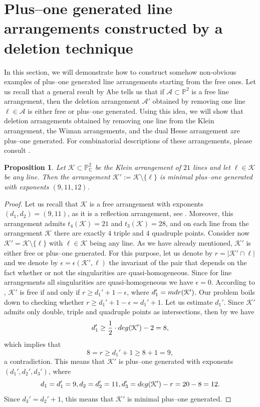 \documentclass[12pt]{article}
\theoremstyle{plain}
\newtheorem{proposition}[thm]{Proposition}
\theoremstyle{definition}
\begin{document}
\section{Plus--one generated line arrangements constructed by a deletion technique}
In this section, we will demonstrate how to construct somehow non-obvious examples of plus--one generated line arrangements starting from the free ones. Let us recall that a general result by Abe \cite{Abe18} tells us that if $\mathcal{A} \subset \mathbb{P}^{2}$ is a free line arrangement, then the deletion arrangement $\mathcal{A}'$ obtained by removing one line $\ell \in \mathcal{A}$ is either free or plus--one generated. Using this idea, we will show that deletion arrangements obtained by removing one line from the Klein arrangement, the Wiman arrangements, and the dual Hesse arrangement are plus--one generated. For combinatorial descriptions of these arrangements, please consult \cite{bnc}. 
\begin{proposition}
\label{klein}
Let $\mathcal{K} \subset \mathbb{P}^{2}_{\mathbb{C}}$ be the Klein arrangement of $21$ lines and let $\ell \in \mathcal{K}$ be any line. Then the arrangement $\mathcal{K}' :=\mathcal{K} \setminus \{\ell\}$ is minimal plus--one generated with exponents $(9,11,12)$.
\end{proposition}
\begin{proof}
Let us recall that $\mathcal{K}$ is a free arrangement with exponents $(d_{1},d_{2}) = (9,11)$, as it is a reflection arrangement, see \cite[Chapter 6]{OT92}. Moreover, this arrangement admits $t_{4}(\mathcal{K})=21$ and $t_{3}(\mathcal{K})=28$, and on each line from the arrangement $\mathcal{K}$ there are exactly $4$ triple and $4$ quadruple points. Consider now $\mathcal{K}' = \mathcal{K} \setminus \{\ell\}$ with $\ell \in \mathcal{K}$ being any line. As we have already mentioned, $\mathcal{K}'$ is either free or plus--one generated. 
For this purpose, let us denote by $r = |\mathcal{K}' \cap \ell|$ and we denote by $\epsilon = \epsilon(\mathcal{K}',\ell)$ the invariant of the pair that depends on the fact whether or not the singularities are quasi-homogeneous. Since for line arrangements all singularities are quasi-homogeneous we have $\epsilon = 0$. According to \cite[Theorem 1.3 (3)]{POG}, $\mathcal{K}'$ is free if and only if $r \geq d_{1}' + 1 - \epsilon$, where $d_{1}' = {\rm mdr}(\mathcal{K}')$. Our problem boils down to checking whether $r \geq d_{1}' + 1 - \epsilon = d_{1}'+1$.
Let us estimate $d_{1}'$. Since $\mathcal{K}'$ admits only double, triple and quadruple points as intersections, then by \cite[Theorem 2.1]{Dimca1} we have
$$d_{1}' \geq \frac{1}{2}\cdot {\rm deg}(\mathcal{K}')-2 = 8,$$
which implies that
$$8 = r \geq d_{1}' + 1 \geq 8+1 = 9,$$
a contradiction. This means that $\mathcal{K}'$ is plus--one generated with exponents $(d_{1}',d_{2}',d_{3}')$, where
$$d_{1} =d_{1}'=9, d_{2} = d_{2}'=11, d_{3}' = {\rm deg}(\mathcal{K}')-r = 20 - 8 = 12.$$
Since $d_{3}'=d_{2}'+1$, this means that $\mathcal{K}'$ is minimal plus--one generated.
\end{proof}
\end{document}
